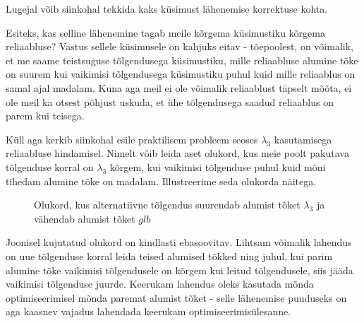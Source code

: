 \documentclass[a4paper,12pt,oneside]{article}
\newenvironment{naide}{
    \begin{lrbox}{\boxTwo}
        \begin{minipage}{\textwidth}
    }
    {\end{minipage}\end{lrbox}
    	\colorbox{background_example}{\usebox{\boxTwo}}
    }
\numberwithin{equation}{section}
\theoremstyle{definition}
\begin{document}
Lugejal võib siinkohal tekkida kaks küsimust lähenemise korrektuse kohta.

Esiteks, kas selline lähenemine tagab meile kõrgema küsimustiku kõrgema reliaabluse? Vastus sellele küsimusele on kahjuks eitav - tõepoolest, on võimalik, et me saame teistsuguse tõlgendusega küsimustiku, mille reliaabluse alumine tõke on suurem kui vaikimisi tõlgendusega küsimustiku puhul kuid mille reliaablus on samal ajal madalam. Kuna aga meil ei ole võimalik reliaablust täpselt mõõta, ei ole meil ka otsest põhjust uskuda, et ühe tõlgendusega saadud reliaablus on parem kui teisega.

Küll aga kerkib siinkohal esile praktilisem probleem seoses $\lambda_3$ kasutamisega reliaabluse hindamisel. Nimelt võib leida aset olukord, kus meie poolt pakutava tõlgenduse korral on $\lambda_3$ kõrgem, kui vaikimisi tõlgenduse puhul kuid mõni tihedam alumine tõke on madalam. Illustreerime seda olukorda näitega.
 
\begin{figure}[H]
\begin{naide}
\end{naide}
\caption{Olukord, kus alternatiivne tõlgendus suurendab alumist tõket $\lambda_3$ ja vähendab alumist tõket $glb$}
\end{figure}

Joonisel kujutatud olukord on kindlasti ebasoovitav. Lihtsam võimalik lahendus on uue tõlgenduse korral leida teised alumised tõkked ning juhul, kui parim alumine tõke vaikimisi tõlgendusele on kõrgem kui leitud tõlgendusele, siis jääda vaikimisi tõlgenduse juurde. Keerukam lahendus oleks kasutada mõnda optimiseerimisel mõnda paremat alumist tõket - selle lähenemise puuduseks on aga kaasnev vajadus lahendada keerukam optimiseerimisülesanne.
\end{document}
